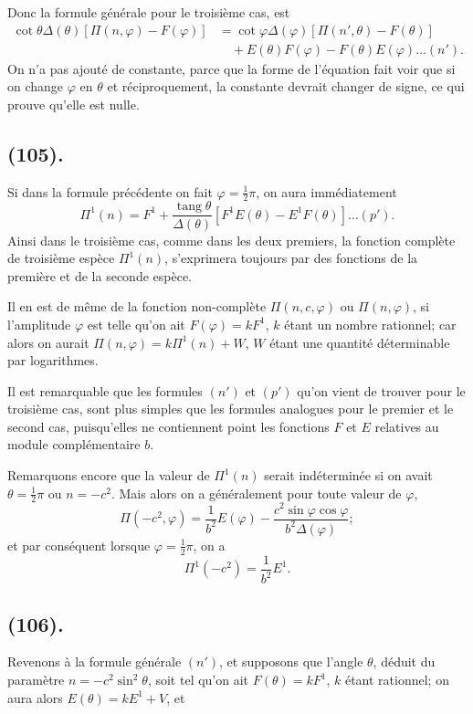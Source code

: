 \documentclass{article}
\begin{document}
Donc la formule générale pour le troisième cas, est
\[ \begin{aligned} \cot\theta\Delta(\theta)[\Pi(n,\varphi)-F(\varphi)]&=\cot\varphi\Delta(\varphi)[\Pi(n',\theta)-F(\theta)]\\ &\quad+E(\theta)F(\varphi)-F(\theta)E(\varphi)\ldots(n'). \end{aligned} \]
On n'a pas ajouté de constante, parce que la forme de l'équation fait voir que si on change $\varphi$ en $\theta$ et réciproquement, la constante devrait changer de signe, ce qui prouve qu'elle est nulle.

\subsection*{(105).}

Si dans la formule précédente on fait $\varphi=\frac{1}{2}\pi$, on aura immédiatement
\[ \Pi^{1}(n)=F^{1}+\frac{\operatorname{tang}\theta}{\Delta(\theta)}[F^{1}E(\theta)-E^{1}F(\theta)]\ldots(p'). \]
Ainsi dans le troisième cas, comme dans les deux premiers, la fonction complète de troisième espèce $\Pi^{1}(n)$, s'exprimera toujours par des fonctions de la première et de la seconde espèce.

Il en est de même de la fonction non-complète $\Pi(n,c,\varphi)$ ou $\Pi(n,\varphi)$, si l'amplitude $\varphi$ est telle qu'on ait $F(\varphi)=kF^{1}$, $k$ étant un nombre rationnel; car alors on aurait $\Pi(n,\varphi)=k\Pi^{1}(n)+W$, $W$ étant une quantité déterminable par logarithmes.

Il est remarquable que les formules $(n')$ et $(p')$ qu'on vient de trouver pour le troisième cas, sont plus simples que les formules analogues pour le premier et le second cas, puisqu'elles ne contiennent point les fonctions $F$ et $E$ relatives au module complémentaire $b$.

Remarquons encore que la valeur de $\Pi^{1}(n)$ serait indéterminée si on avait $\theta=\frac{1}{2}\pi$ ou $n=-c^{2}$. Mais alors on a généralement pour toute valeur de $\varphi$,
\[ \Pi(-c^{2},\varphi)=\frac{1}{b^{2}}E(\varphi)-\frac{c^{2}\sin\varphi\cos\varphi}{b^{2}\Delta(\varphi)}; \]
et par conséquent lorsque $\varphi=\frac{1}{2}\pi$, on a
\[ \Pi^{1}(-c^{2})=\frac{1}{b^{2}}E^{1}. \]

\subsection*{(106).}

Revenons à la formule générale $(n')$, et supposons que l'angle $\theta$, déduit du paramètre $n=-c^{2}\sin^{2}\theta$, soit tel qu'on ait $F(\theta)=kF^{1}$, $k$ étant rationnel; on aura alors $E(\theta)=kE^{1}+V$, et
\end{document}
